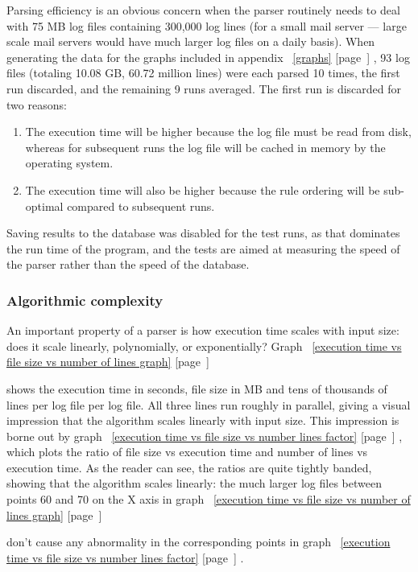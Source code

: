 \documentclass[a4paper,12pt,draft]{article}
\newcommand{\refwithpage}[1]{%
    \empty{}\ref{#1} [page~\pageref{#1}]%
}
\begin{document}
\label{rule efficiency}

Parsing efficiency is an obvious concern when the parser routinely needs to
deal with 75 MB log files containing 300,000 log lines (for a small mail
server --- large scale mail servers would have much larger log files on a
daily basis).  When generating the data for the graphs included in
appendix~\refwithpage{graphs}, 93 log files (totaling 10.08 GB, 60.72
million lines) were each parsed 10 times, the first run discarded, and the
remaining 9 runs averaged.  The first run is discarded for two reasons:

\begin{enumerate}

    \item The execution time will be higher because the log file must be
        read from disk, whereas for subsequent runs the log file will be
        cached in memory by the operating system.

    \item The execution time will also be higher because the rule ordering
        will be sub-optimal compared to subsequent runs.

\end{enumerate}

Saving results to the database was disabled for the test runs, as that
dominates the run time of the program, and the tests are aimed at measuring
the speed of the parser rather than the speed of the database.

\subsubsection{Algorithmic complexity}

An important property of a parser is how execution time scales with input
size: does it scale linearly, polynomially, or exponentially?
Graph~\refwithpage{execution time vs file size vs number of lines graph}
shows the execution time in seconds, file size in MB and tens of thousands
of lines per log file per log file.  All three lines run roughly in
parallel, giving a visual impression that the algorithm scales linearly
with input size.  This impression is borne out by
graph~\refwithpage{execution time vs file size vs number lines factor},
which plots the ratio of file size vs execution time and number of lines vs
execution time.  As the reader can see, the ratios are quite tightly
banded, showing that the algorithm scales linearly: the much larger log
files between points 60 and 70 on the X axis in
graph~\refwithpage{execution time vs file size vs number of lines graph}
don't cause any abnormality in the corresponding points in
graph~\refwithpage{execution time vs file size vs number lines factor}.
\end{document}
